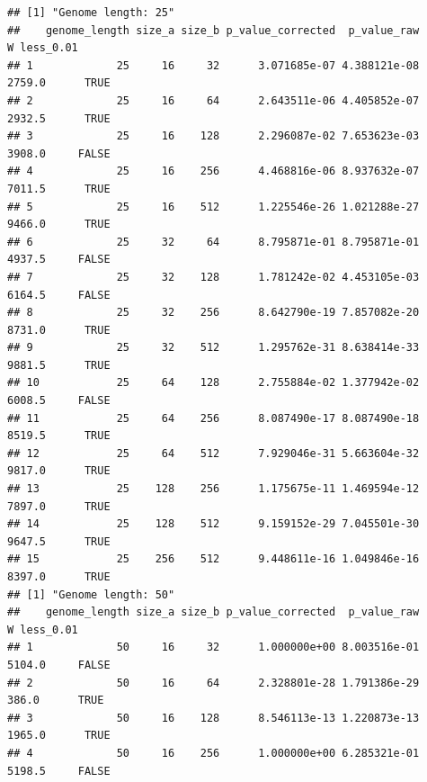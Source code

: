 \documentclass[]{book}
\newenvironment{Shaded}{\begin{snugshade}}{\end{snugshade}}
\newcommand{\DataTypeTok}[1]{\textcolor[rgb]{0.13,0.29,0.53}{#1}}
\newcommand{\FloatTok}[1]{\textcolor[rgb]{0.00,0.00,0.81}{#1}}
\newcommand{\KeywordTok}[1]{\textcolor[rgb]{0.13,0.29,0.53}{\textbf{#1}}}
\newcommand{\NormalTok}[1]{#1}
\newcommand{\OperatorTok}[1]{\textcolor[rgb]{0.81,0.36,0.00}{\textbf{#1}}}
\newcommand{\StringTok}[1]{\textcolor[rgb]{0.31,0.60,0.02}{#1}}
\begin{document}
\begin{Shaded}
\end{Shaded}

\begin{verbatim}
## [1] "Genome length: 25"
##    genome_length size_a size_b p_value_corrected  p_value_raw      W less_0.01
## 1             25     16     32      3.071685e-07 4.388121e-08 2759.0      TRUE
## 2             25     16     64      2.643511e-06 4.405852e-07 2932.5      TRUE
## 3             25     16    128      2.296087e-02 7.653623e-03 3908.0     FALSE
## 4             25     16    256      4.468816e-06 8.937632e-07 7011.5      TRUE
## 5             25     16    512      1.225546e-26 1.021288e-27 9466.0      TRUE
## 6             25     32     64      8.795871e-01 8.795871e-01 4937.5     FALSE
## 7             25     32    128      1.781242e-02 4.453105e-03 6164.5     FALSE
## 8             25     32    256      8.642790e-19 7.857082e-20 8731.0      TRUE
## 9             25     32    512      1.295762e-31 8.638414e-33 9881.5      TRUE
## 10            25     64    128      2.755884e-02 1.377942e-02 6008.5     FALSE
## 11            25     64    256      8.087490e-17 8.087490e-18 8519.5      TRUE
## 12            25     64    512      7.929046e-31 5.663604e-32 9817.0      TRUE
## 13            25    128    256      1.175675e-11 1.469594e-12 7897.0      TRUE
## 14            25    128    512      9.159152e-29 7.045501e-30 9647.5      TRUE
## 15            25    256    512      9.448611e-16 1.049846e-16 8397.0      TRUE
## [1] "Genome length: 50"
##    genome_length size_a size_b p_value_corrected  p_value_raw      W less_0.01
## 1             50     16     32      1.000000e+00 8.003516e-01 5104.0     FALSE
## 2             50     16     64      2.328801e-28 1.791386e-29  386.0      TRUE
## 3             50     16    128      8.546113e-13 1.220873e-13 1965.0      TRUE
## 4             50     16    256      1.000000e+00 6.285321e-01 5198.5     FALSE

\end{verbatim}
\end{document}
